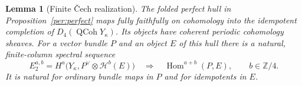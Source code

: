 \documentclass[11pt]{article}
\newtheorem{lemma}[theorem]{Lemma}
\theoremstyle{definition}
\theoremstyle{remark}
\numberwithin{equation}{section}
\begin{document}
\begin{lemma}[Finite \v Cech realization]
\label{per:coherent}
The folded perfect hull in Proposition~\ref{per:perfect} maps fully
faithfully on cohomology into the idempotent completion of
$D_4(\operatorname{QCoh}Y_\kappa)$.  Its objects have coherent
periodic cohomology sheaves.  For a vector bundle $P$ and an object
$E$ of this hull there is a natural, finite-column spectral sequence
\begin{equation}
 E_2^{a,b}
   =H^a\bigl(Y_\kappa,P^\vee\otimes\mathcal H^b(E)\bigr)
   \quad\Longrightarrow\quad \operatorname{Hom}^{a+b}(P,E),
 \qquad b\in\mathbb Z/4.
 \label{per:spectral-sequence}
\end{equation}
It is natural for ordinary bundle maps in $P$ and for idempotents
in $E$.
\end{lemma}
\end{document}
